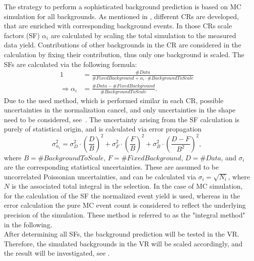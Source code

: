 The strategy to perform a sophisticated background prediction is based on MC simulation for all backgrounds. As mentioned in , different CRs are developed, that are enriched with corresponding background events. In those CRs scale factors (SF) $\alpha_i$ are calculated by scaling the total simulation to the measured data yield. Contributions of other backgrounds in the CR are considered in the calculation by fixing their contribution, thus only one background is scaled. The SFs are calculated via the following formula:
\begin{align}
 1                        & = \frac{\#Data}{\#FixedBackground+\alpha_i\cdot\#BackgroundToScale} \\
 \Longrightarrow \alpha_i & = \frac{\#Data-\#FixedBackground}{\#BackgroundToScale}.             
\end{align}
Due to the used method, which is performed similar in each CR, possible uncertainties in the normalization cancel, and only uncertainties in the shape need to be considered, see~. The uncertainty arising from the SF calculation is purely of statistical origin, and is calculated via error propagation
\begin{equation}
 \sigma_{\alpha_i}^2 = \sigma_{D}^2 \cdot \left(\frac{D}{B}\right)^2 + \sigma_{F}^2 \cdot \left(\frac{F}{B}\right)^2 + \sigma_{B}^2 \cdot \left(\frac{D-F}{B^2}\right)^2,
\end{equation}
where $B=\#BackgroundToScale$, $F=\#FixedBackground$, $D=\#Data$, and $\sigma_i$ are the corresponding statistical uncertainties. These are assumed to be uncorrelated Poissonian uncertainties, and can be calculated via $\sigma_i=\sqrt{N_i}$, where $N$ is the associated total integral in the selection. In the case of MC simulation, for the calculation of the SF the normalized event yield is used, whereas in the error calculation the pure MC event count is considered to reflect the underlying precision of the simulation. These method is referred to as the "integral method" in the following.\\
After determining all SFs, the background prediction will be tested in the VR. Therefore, the simulated backgrounds in the VR will be scaled accordingly, and the result will be investigated, see .



